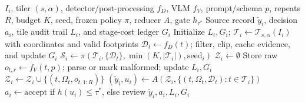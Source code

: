 \begin{algorithm}[t]
\caption{Fixed-budget source inference with selective review}
\label{alg:ornascout}
\begin{algorithmic}[1]
\Require $I_i$, tiler $(s,\alpha)$, detector/post-processing $f_D$, VLM $f_V$, prompt/schema $p$, repeats $R$, budget $K$, seed, frozen policy $\pi$, reducer $A$, gate $h_{\tau^*}$
\Ensure Source record $\tilde y_i$, decision $a_i$, tile audit trail $L_i$, and stage-cost ledger $G_i$
\State Initialize $L_i,G_i$; $\mathcal{T}_i\gets\mathcal{T}_{s,\alpha}(I_i)$ with coordinates and valid footprints
  \State $\mathcal{D}_t\gets f_D(t)$; filter, clip, cache evidence, and update $G_i$
\EndFor
\State $\mathcal{S}_i\gets\pi(\mathcal{T}_i,\{\mathcal{D}_t\},\min(K,|\mathcal{T}_i|),\mathrm{seed}_i)$
\State $\mathcal{Z}_i\gets\emptyset$
    \State Store raw $o_{t,r}\gets f_V(t,p)$; parse or mark malformed; update $L_i,G_i$
  \EndFor
  \State $\mathcal{Z}_i\gets\mathcal{Z}_i\cup\{(t,\Omega_t,o_{t,1:R})\}$
\EndFor
\State $(\tilde y_i,u_i)\gets A(\mathcal{Z}_i,\{(t,\Omega_t,\mathcal{D}_t):t\in\mathcal{T}_i\})$
\State $a_i\gets\mathrm{accept}$ if $h(u_i)\leq\tau^*$, else $\mathrm{review}$
\State \Return $\tilde y_i,a_i,L_i,G_i$
\end{algorithmic}
\end{algorithm}
